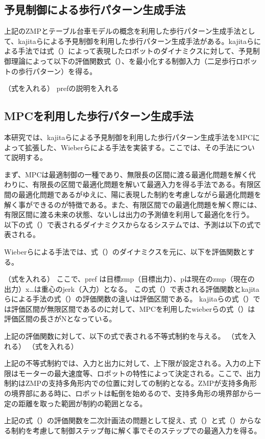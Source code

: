 \subsection{予見制御による歩行パターン生成手法}
上記のZMPとテーブル台車モデルの概念を利用した歩行パターン生成手法として、kajitaらによる予見制御を利用した歩行パターン生成手法\cite{PREVIEW}がある。kajitaらによる手法では式（）によって表現したロボットのダイナミクスに対して、予見制御理論によって以下の評価関数式（）、を最小化する制御入力（二足歩行ロボットの歩行パターン）を得る。

（式を入れる）
prefの説明を入れる

\subsection{MPCを利用した歩行パターン生成手法}
本研究では、kajitaらによる予見制御を利用した歩行パターン生成手法\cite{PREVIEW}をMPCによって拡張した、Wieberらによる手法\cite{WIEBER}を実装する。ここでは、その手法\cite{WIEBER}について説明する。

まず、MPCは最適制御の一種であり、無限長の区間に渡る最適化問題を解く代わりに、有限長の区間で最適化問題を解いて最適入力を得る手法である。有限区間の最適化問題であるがゆえに、陽に表現した制約を考慮しながら最適化問題を解く事ができるのが特徴である。また、有限区間での最適化問題を解く際には、有限区間に渡る未来の状態、ないしは出力の予測値を利用して最適化を行う。
以下の式（）で表されるダイナミクスからなるシステムでは、予測は以下の式で表される。

Wieberらによる手法\cite{WIEBER}では、式（）のダイナミクスを元に、以下を評価関数とする。

（式を入れる）
ここで、pref は目標zmp（目標出力）、pは現在のzmp（現在の出力）x…は重心のjerk（入力）となる。
この式（）で表される評価関数とkajitaらによる手法の式（）の評価関数の違いは評価区間である。
kajitaらの式（）では評価区間が無限区間であるのに対して、MPCを利用したwieberらの式（）は評価区間の長さがNとなっている。

上記の評価関数に対して、以下の式で表される不等式制約を与える。
（式を入れる）
（式を入れる）

上記の不等式制約では、入力と出力に対して、上下限が設定される。入力の上下限はモーターの最大速度等、ロボットの特性によって決定される。ここで、出力制約はZMPの支持多角形内での位置に対しての制約となる。ZMPが支持多角形の境界部にある時に、ロボットは転倒を始めるので、支持多角形の境界部から一定の距離を取った範囲が制約の範囲となる。

上記の式（）の評価関数を二次計画法の問題として捉え、式（）と式（）からなる制約を考慮して制御ステップ毎に解く事でそのステップでの最適入力を得る。